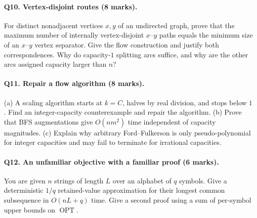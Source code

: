 \documentclass[10pt]{article}
\theoremstyle{definition}
\newcommand{\OPT}{\operatorname{OPT}}
\begin{document}
\paragraph{Q10. Vertex-disjoint routes (8 marks).}
For distinct nonadjacent vertices $x,y$ of an undirected graph, prove that
the maximum number of internally vertex-disjoint $x$--$y$ paths equals
the minimum size of an $x$--$y$ vertex separator.  Give the flow construction
and justify both correspondences.  Why do capacity-$1$ splitting arcs
suffice, and why are the other arcs assigned capacity larger than $n$?

\paragraph{Q11. Repair a flow algorithm (8 marks).}
(a) A scaling algorithm starts at $k=C$, halves by real division, and stops
below $1$.  Find an integer-capacity counterexample and repair the algorithm.
(b) Prove that BFS augmentations give $O(nm^2)$ time independent of capacity
magnitudes.  (c) Explain why arbitrary Ford--Fulkerson is only
pseudo-polynomial for integer capacities and may fail to terminate for
irrational capacities.

\paragraph{Q12. An unfamiliar objective with a familiar proof (6 marks).}
You are given $n$ strings of length $L$ over an alphabet of $q$ symbols.
Give a deterministic $1/q$ retained-value approximation for their longest
common subsequence in $O(nL+q)$ time.  Give a second proof using a sum of
per-symbol upper bounds on $\OPT$.
\end{document}
